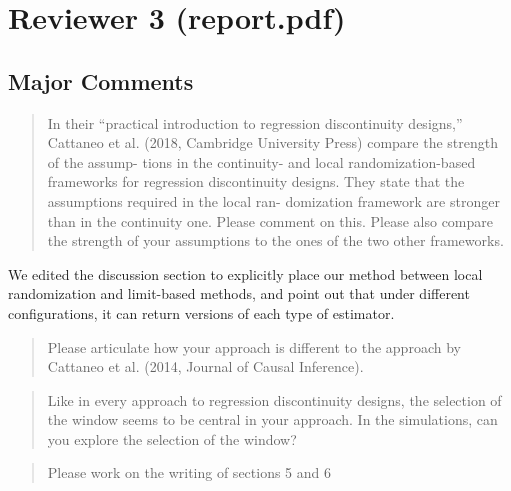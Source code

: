 \documentclass[12pt]{article}
\begin{document}
\section{Reviewer 3 (report.pdf)}

\subsection{Major Comments}
\begin{quote}
In their “practical introduction to regression discontinuity designs,”
Cattaneo et al. (2018, Cambridge University Press) compare the
strength of the assump- tions in the continuity- and local
randomization-based frameworks for regression discontinuity
designs. They state that the assumptions required in the local ran-
domization framework are stronger than in the continuity one. Please
comment on this. Please also compare the strength of your assumptions
to the ones of the two other frameworks.
\end{quote}

We edited the discussion section to explicitly place our method
between local randomization and limit-based methods, and point out
that under different configurations, it can return versions of each
type of estimator.

\begin{quote}
Please articulate how your approach is different to the approach by
Cattaneo et al. (2014, Journal of Causal Inference).
\end{quote}

\begin{quote}
Like in every approach to regression discontinuity designs, the
selection of the window seems to be central in your approach. In the
simulations, can you explore the selection of the window?
\end{quote}

\begin{quote}
Please work on the writing of sections 5 and 6
\end{quote}
\end{document}
